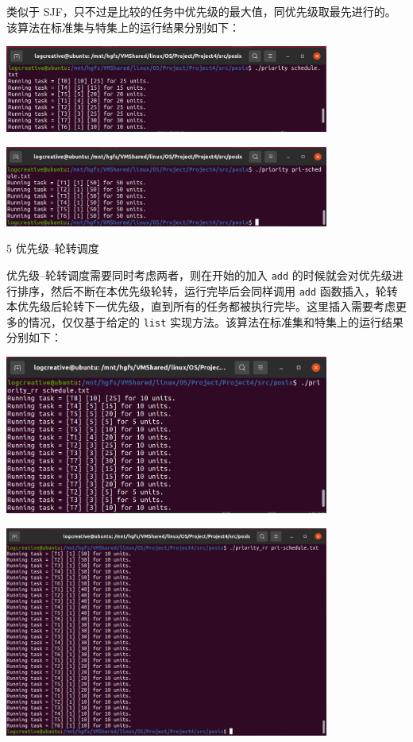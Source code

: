 \documentclass[12pt,a4paper]{article}
\newenvironment{problems}{\begin{list}{}{\renewcommand{\makelabel}[1]{\textbf{##1}\hfil}}}{\end{list}}
\newenvironment{steps}{\begin{list}{}{\renewcommand{\makelabel}[1]{##1.\hfil}}}{\end{list}}
\begin{document}
\begin{problems}
\begin{steps}
        

        类似于 SJF，只不过是比较的任务中优先级的最大值，同优先级取最先进行的。该算法在标准集与特集上的运行结果分别如下：

        \includegraphics[width=0.8\textwidth]{pri1.png}

        \includegraphics[width=0.8\textwidth]{pri2.png}
        
        \item[5] 优先级--轮转调度
        
        

        优先级--轮转调度需要同时考虑两者，则在开始的加入 \verb"add" 的时候就会对优先级进行排序，然后不断在本优先级轮转，运行完毕后会同样调用 \verb"add" 函数插入，轮转本优先级后轮转下一优先级，直到所有的任务都被执行完毕。这里插入需要考虑更多的情况，仅仅基于给定的 \verb"list" 实现方法。该算法在标准集和特集上的运行结果分别如下：
        
        \includegraphics[width=0.8\textwidth]{prrr1.png}

        \includegraphics[width=0.8\textwidth]{prrr2.png}


\end{steps}
\end{problems}
\end{document}
